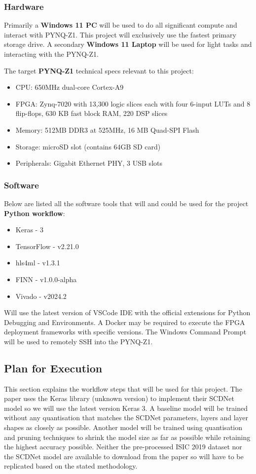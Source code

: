\documentclass[12pt,nonacm,acmlarge,titlepage,screen]{acmart}
\begin{document}
		\subsubsection{Hardware}
		Primarily a \textbf{Windows 11 PC} will be used to do all significant compute and interact with PYNQ-Z1. This project will exclusively use the fastest primary storage drive. A secondary \textbf{Windows 11 Laptop} will be used for light tasks and interacting with the PYNQ-Z1.
		
		\noindent
		The target \textbf{PYNQ-Z1} technical specs relevant to this project:
		\begin{itemize}
			\item CPU: 650MHz dual-core Cortex-A9
			\item FPGA: Zynq-7020 with 13,300 logic slices each with four 6-input LUTs and 8 flip-flops, 630 KB fast block RAM, 220 DSP slices
			\item Memory: 512MB DDR3 at 525MHz, 16 MB Quad-SPI Flash
			\item Storage: microSD slot (contains 64GB SD card)
			\item Peripherals: Gigabit Ethernet PHY, 3 USB slots
		\end{itemize}

		\subsubsection{Software}
		Below are listed all the software tools that will and could be used for the project \textbf{Python workflow}:
		\begin{itemize}
			\item Keras - 3
			\item TensorFlow - v2.21.0
			\item hls4ml - v1.3.1
			\item FINN - v1.0.0-alpha
			\item Vivado - v2024.2
		\end{itemize}

		\noindent
		Will use the latest version of VSCode IDE with the official extensions for Python Debugging and Environments. A Docker may be required to execute the FPGA deployment frameworks with specific versions. The Windows Command Prompt will be used to remotely SSH into the PYNQ-Z1.

	\subsection{Plan for Execution}
	This section explains the workflow steps that will be used for this project. The paper uses the Keras library (unknown version) to implement their SCDNet model so we will use the latest version Keras 3. A baseline model will be trained without any quantisation that matches the SCDNet parameters, layers and layer shapes as closely as possible. Another model will be trained using quantisation and pruning techniques to shrink the model size as far as possible while retaining the highest accuracy possible. Neither the pre-processed ISIC 2019 dataset nor the SCDNet model are available to download from the paper \cite{scdnet_2022} so will have to be replicated based on the stated methodology.
\end{document}
